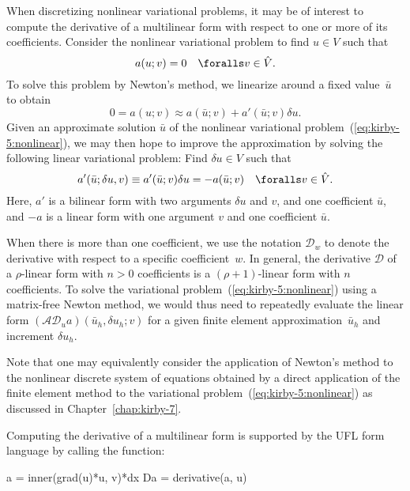 When discretizing nonlinear variational problems, it may be of
interest to compute the derivative of a multilinear form with respect
to one or more of its coefficients. Consider the nonlinear variational
problem to find $u \in V$ such that
\begin{equation} \label{eq:kirby-5:nonlinear}
  a(u; v) = 0 \quad \foralls v \in \hat{V}.
\end{equation}
To solve this problem by Newton's method, we linearize around a fixed
value~$\bar{u}$ to obtain
\begin{equation}
  0 = a(u; v) \approx a(\bar{u}; v) + a'(\bar{u}; v) \delta u.
\end{equation}
Given an approximate solution $\bar{u}$ of the nonlinear variational
problem~(\ref{eq:kirby-5:nonlinear}), we may then hope to improve the
approximation by solving the following linear variational problem:
Find $\delta u \in V$ such that
\begin{equation}
  a'(\bar{u}; \delta u, v) \equiv a'(\bar{u}; v) \delta u = -a(\bar{u}; v)
  \quad \foralls v \in \hat{V}.
\end{equation}
Here, $a'$ is a bilinear form with two arguments $\delta u$ and $v$,
and one coefficient $\bar{u}$, and $-a$ is a linear form with one
argument $v$ and one coefficient $\bar{u}$.

When there is more than one coefficient, we use the notation
$\mathcal{D}_w$ to denote the derivative with respect to a specific
coefficient~$w$. In general, the derivative $\mathcal{D}$ of a
$\rho$-linear form with $n > 0$ coefficients is a $(\rho+1)$-linear
form with $n$ coefficients. To solve the variational
problem~(\ref{eq:kirby-5:nonlinear}) using a matrix-free Newton
method, we would thus need to repeatedly evaluate the linear form
$(\mathcal{A}\mathcal{D}_u a) (\bar{u}_h, \delta u_h; v)$ for a given
finite element approximation~$\bar{u}_h$ and increment $\delta u_h$.

Note that one may equivalently consider the application of Newton's
method to the nonlinear discrete system of equations obtained by a
direct application of the finite element method to the variational
problem~(\ref{eq:kirby-5:nonlinear}) as discussed in
Chapter~\ref{chap:kirby-7}.

Computing the derivative of a multilinear form is supported by the UFL
form language by calling the  function:
\begin{python}
  a  = inner(grad(u)*u, v)*dx
  Da = derivative(a, u)
\end{python}

